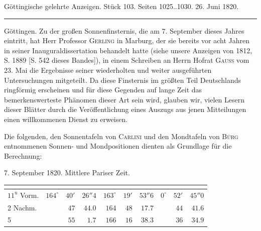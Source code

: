 \clearpage
{}
\hypertarget{native-627-lower}{}
\begin{center}\small Göttingische gelehrte Anzeigen. Stück 103. Seiten 1025..1030. 26. Juni 1820.\\[3pt]\rule{.72\linewidth}{.3pt}\end{center}

Göttingen. Zu der großen Sonnenfinsternis, die am 7. September dieses Jahres eintritt, hat Herr Professor \textsc{Gerling} in Marburg, der sie bereits vor acht Jahren in seiner Inauguraldissertation behandelt hatte (siehe unsere Anzeigen von 1812, S. 1889 [S. 542 dieses Bandes]), in einem Schreiben an Herrn Hofrat \textsc{Gauss} vom 23. Mai die Ergebnisse seiner wiederholten und weiter ausgeführten Untersuchungen mitgeteilt. Da diese Finsternis im größten Teil Deutschlands ringförmig erscheinen und für diese Gegenden auf lange Zeit das bemerkenswerteste Phänomen dieser Art sein wird, glauben wir, vielen Lesern dieser Blätter  durch die Veröffentlichung eines Auszugs aus jenen Mitteilungen einen willkommenen Dienst zu erweisen.

Die folgenden, den Sonnentafeln von \textsc{Carlini} und den Mondtafeln von \textsc{Bürg} entnommenen Sonnen- und Mondpositionen dienten als Grundlage für die Berechnung:

7. September 1820. Mittlere Pariser Zeit.

\begin{center}
\small\setlength{\tabcolsep}{2pt}\begin{tabular}{l|rrr|rrr|rrr}
 &  &  &  \\
\hline
$11^{\mathrm u}$ Vorm. & $164^\circ$ & $40'$ & $26''4$ & $163^\circ$ & $19'$ & $53''6$ & $0^\circ$ & $52'$ & $45''0$ \\
2 Nachm. & & $47$ & $44.0$ & $164$ & $48$ & $17.7$ & & $44$ & $41.6$ \\
5 & & $55$ & $1.7$ & $166$ & $16$ & $38.3$ & & $36$ & $34.9$ \\
\end{tabular}
\end{center}

